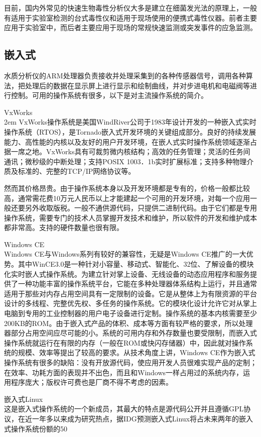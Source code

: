 	目前，国内外常见的快速生物毒性分析仪大多是建立在细菌发光法的原理上，一般有适用于实验室检测的台式毒性仪和适用于现场使用的便携式毒性仪器。前者主要应用于实验室中，而后者主要应用于现场的常规快速监测或突发事件的应急监测。
\subsection{嵌入式}
	水质分析仪的ARM处理器负责接收并处理采集到的各种传感器信号，调用各种算法，把处理后的数据在显示屏上进行显示和绘制曲线，并对步进电机和电磁阀等进行控制。可用的操作系统有很多，以下是对主流操作系统的简介。\cite{os}
\begin{CJKenumerate}
\item VxWorks \\
	\parindent 2em \indent VxWorks操作系统是美国WindRiver公司于1983年设计开发的一种嵌入式实时操作系统（RTOS），是Tornado嵌入式开发环境的关键组成部分。良好的持续发展能力、高性能的内核以及友好的用户开发环境，在嵌人式实时操作系统领域逐渐占据一席之地。VxWorks具有可裁剪微内核结构；高效的任务管理；灵活的任务间通讯；微秒级的中断处理；支持POSIX 1003．1b实时扩展标准；支持多种物理介质及标准的、完整的TCP/IP网络协议等。

	然而其价格昂贵。由于操作系统本身以及开发环境都是专有的，价格一般都比较高，通常需花费10万元人民币以上才能建起一个可用的开发环境，对每一个应用一般还要另外收取版税。一般不通供源代码，只提供二进制代码。由于它们都是专用操作系统，需要专门的技术人员掌握开发技术和维护，所以软件的开发和维护成本都非常高。支持的硬件数量也很有限。
\item Windows CE\\
	\indent Windows CE与Windows系列有较好的兼容性，无疑是Windows CE推广的一大优势。其中WinCE3.0是一种针对小容量、移动式、智能化、32位、了解设备的模块化实时嵌人式操作系统。为建立针对掌上设备、无线设备的动态应用程序和服务提供了一种功能丰富的操作系统平台，它能在多种处理器体系结构上运行，并且通常适用于那些对内存占用空间具有一定限制的设备。它是从整体上为有限资源的平台设计的多线程、完整优先权、多任务的操作系统。它的模块化设计允许它对从掌上电脑到专用的工业控制器的用户电子设备进行定制。操作系统的基本内核需要至少200KB的ROM。由于嵌入式产品的体积、成本等方面有较严格的要求，所以处理器部分占用空间应尽可能的小。系统的可用内存和外存数量也要受限制，而嵌入式操作系统就运行在有限的内存（一般在ROM或快闪存储器）中，因此就对操作系统的规模、效率等提出了较高的要求。从技术角度上讲，Windows CE作为嵌入式操作系统有很多的缺陷：没有开放源代码，使应用开发人员很难实现产品的定制；在效率、功耗方面的表现并不出色，而且和Windows一样占用过的系统内存，运用程序庞大；版权许可费也是厂商不得不考虑的因素。
\item 嵌入式Linux\\
	\indent 这是嵌入式操作系统的一个新成员，其最大的特点是源代码公开并且遵循GPL协议，在近一年多以来成为研究热点，据IDG预测嵌入式Linux将占未来两年的嵌入式操作系统份额的50%


\end{CJKenumerate}
